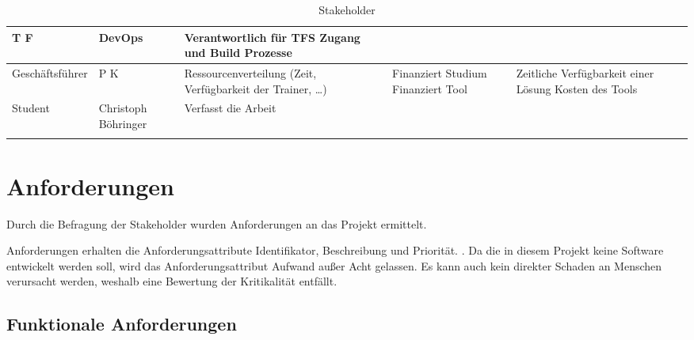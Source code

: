 \begin{tiny}
\begin{longtable}[H]{llL{3cm}L{3cm}L{3cm}}
            T F & DevOps                                                           & 
            Verantwortlich für TFS Zugang und Build Prozesse                                  &                                                                \\
            \midrule
            Geschäftsführer  & 
            P K      & 
            Ressourcenverteilung (Zeit, Verfügbarkeit der Trainer, \dots)    & 
            Finanziert Studium \newline Finanziert Tool                                       & Zeitliche Verfügbarkeit einer Lösung \newline Kosten des Tools \\
            \midrule
            Student          & 
            Christoph Böhringer                & 
            Verfasst die Arbeit                                              &                                                                                   &                                                                \\
            \bottomrule
    \caption{Stakeholder}
    \label{tab:stakeholder}
\end{longtable}
\end{tiny}

\section{Anforderungen}
\label{sec:anforderungen}

Durch die Befragung der Stakeholder wurden Anforderungen an das Projekt ermittelt.

Anforderungen erhalten die Anforderungsattribute Identifikator, Beschreibung und Priorität.
\cite[S.~479~f.]{Balzert:Lehrbuch-der-softwaretechnik}. Da die in diesem Projekt keine Software entwickelt werden soll, wird das Anforderungsattribut \glqq{}Aufwand\grqq{} außer
Acht gelassen. Es kann auch kein direkter Schaden an Menschen verursacht werden, weshalb eine Bewertung der \glqq{}Kritikalität\grqq{} entfällt.

\subsection{Funktionale Anforderungen}
\label{subsec:funktional}


